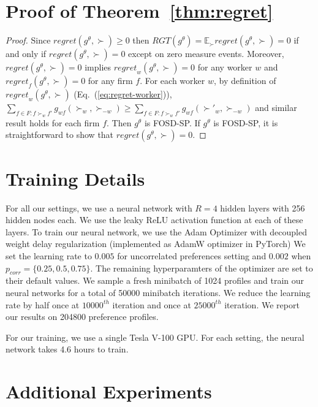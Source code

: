 \section{Proof of Theorem~\ref{thm:regret}}\label{app:omitted-proofs}
\begin{proof}
Since $\mathit{regret}(g^\theta, \succ)\geq 0$ then $\mathit{RGT}(g^\theta)=\mathbb{E}_{\succ} \mathit{regret}(g^\theta,\succ)=0$ if and only if 
$\mathit{regret}(g^\theta, \succ)= 0$  \sloppy except on zero measure events. 
Moreover, $\mathit{regret}(g^\theta, \succ)= 0$ implies $\mathit{regret}_w(g^\theta, \succ) = 0$ for any worker $w$ and $\mathit{regret}_f(g^\theta, \succ) = 0$ for any firm $f$. For each worker $w$, by definition of $\mathit{regret}_w(g^\theta, \succ)$ (Eq.~(\ref{eq:regret-worker})), $\sum_{f\in F: f\succ_w f'} g_{wf}(\succ_w, \succ_{-w}) \geq \sum_{f\in F: f\succ_w f'} g_{wf}(\succ'_w, \succ_{-w})$ and similar result holds for each firm $f$. Then $g^\theta$ is FOSD-SP. If $g^\theta$ is FOSD-SP, it is straightforward to show that $\mathit{regret}(g^\theta, \succ)= 0$.
\end{proof}


\section{Training Details}\label{app:train-detail}

For all our settings, we use a neural network with $R = 4$ hidden layers with 256 hidden nodes each. We use the leaky ReLU activation function at each of these layers. To train our neural network, we use the Adam Optimizer with decoupled weight delay regularization (implemented as AdamW optimizer in PyTorch) We set the learning rate to $0.005$ for uncorrelated preferences setting and $0.002$ when $p_{corr} = \{0.25, 0.5, 0.75\}$. The remaining hyperparamters of the optimizer are set to their default values. We sample a fresh minibatch of 1024 profiles and train our neural networks for a total of 50000 minibatch iterations. We reduce the learning rate by half once at $10000^{th}$ iteration and once at $25000^{th}$ iteration. We report our results on 204800 preference profiles.

For our training, we use a single Tesla V-100 GPU. For each setting, the neural network takes 4.6 hours to train.

\section{Additional Experiments}\label{app:additional-experiments}

